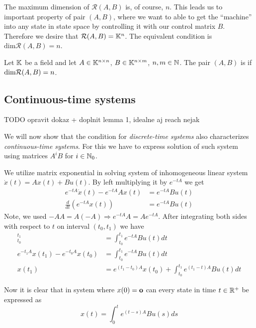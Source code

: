 The maximum dimension of $\mathcal{R}(A,B)$ is, of course, $n$. This leads us to important property of pair $(A,B)$, where we want to able to get the ``machine'' into any state in state space by controlling it with our control matrix $B$. Therefore we desire that $\mathcal{R}(A,B)=\mathbb{K}^n$. The equivalent condition is $\text{dim}\mathcal{R}(A,B)=n$.

\begin{definition}
	Let $\mathbb{K}$ be a field and let $A \in \mathbb{K}^{n \times n}$, $B \in \mathbb{K}^{n \times m}$, $n,m \in \mathbb{N}$. The pair $(A,B)$ is  if $\textnormal{dim}\mathcal{R}(A,B)=n$.
\end{definition}

\subsection{Continuous-time systems}

TODO opravit dokaz + doplnit lemma 1, idealne aj reach nejak

We will now show that the condition for \textit{discrete-time systems} also characterizes \textit{continuous-time systems}. For this we have to express solution of such system using matrices $A^iB$ for $i\in \mathbb{N}_0$. 

We utilize matrix exponential in solving system of inhomogeneous linear system $\dot{x}(t)=Ax(t)+Bu(t)$. By left multiplying it by $e^{-tA}$ we get
\begin{align*}
	e^{-tA}\dot{x}(t)-e^{-tA}Ax(t) &=e^{-tA}Bu(t) \\
	\frac{d}{dt} (e^{-tA}x(t)) &=e^{-tA}Bu(t) 
\end{align*}
Note, we used $-AA=A(-A)\Rightarrow e^{-tA}A=Ae^{-tA}$. After integrating both sides with respect to $t$ on interval $(t_0,t_1)$ we have 
\begin{align*}
	[e^{-tA}x(t)]^{t_1}_{t_0}&=\int^{t_1}_{t_0}e^{-tA}Bu(t)dt \\
	e^{-t_1A}x(t_1)-e^{-t_0A}x(t_0)&=\int^{t_1}_{t_0}e^{-tA}Bu(t)dt \\
	x(t_1)&=e^{(t_1-t_0)A}x(t_0)+\int^{t_1}_{t_0}e^{(t_1-t)A}Bu(t)dt
\end{align*}

Now it is clear that in system where $x(0)=\textbf{o}$ can every state in time $t\in \mathbb{R}^+$ be expressed as $$x(t)=\int^t_0 e^{(t-s)A}Bu(s)ds$$

\begin{lemma}
\label{lem:}
\end{lemma}

